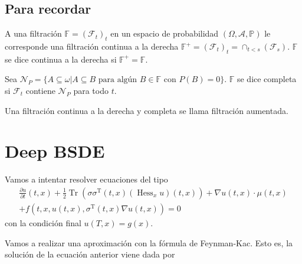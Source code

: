 \documentclass{article}
\newenvironment{recordar}[1][Recordar]
{\begin{tcolorbox}[breakable,colback=red!10!white,colframe=red!50!blue,title=Recordar: #1 ,enhanced jigsaw]
	
}{\end{tcolorbox}}
\begin{document}
    \subsection*{Para recordar}
    \begin{recordar}[Filtración aumentada]
    	A una filtración $\mathbb{F}=(\mathcal{F}_t)_t$ en un espacio de probabilidad $(\Omega,\mathcal{A},\mathbb{P})$ le corresponde una filtración continua a la derecha $\mathbb{F}^+=(\mathcal{F}_t)_t=\cap_{t<s}(\mathcal{F}_s)$. $\mathbb{F}$ se dice continua a la derecha si $\mathbb{F}^+=\mathbb{F}$.
    	
    	Sea $\mathcal{N}_P=\{A\subseteq \omega | A\subseteq B \text{ para algún } B\in \mathbb{F} \text{ con } P(B)=0\}$. $\mathbb{F}$ se dice completa si $\mathcal{F}_t$ contiene $\mathcal{N}_P$ para todo $t$.
    	
    	Una filtración continua a la derecha y completa se llama filtración aumentada.
    \end{recordar}
	\section*{Deep BSDE}
	Vamos a intentar resolver ecuaciones del tipo 
	\begin{equation}
		\begin{gathered}
			\frac{\partial u}{\partial t}(t, x)+\frac{1}{2} \operatorname{Tr}\left(\sigma \sigma^{\mathrm{T}}(t, x)\left(\operatorname{Hess}_x u\right)(t, x)\right)+\nabla u(t, x) \cdot \mu(t, x) \\
			+f\left(t, x, u(t, x), \sigma^{\mathrm{T}}(t, x) \nabla u(t, x)\right)=0
		\end{gathered}
	\end{equation}
con la condición final $u(T,x)=g(x)$.

Vamos a realizar una aproximación con la fórmula de Feynman-Kac. Esto es, la solución de la ecuación anterior viene dada por 
\end{document}
